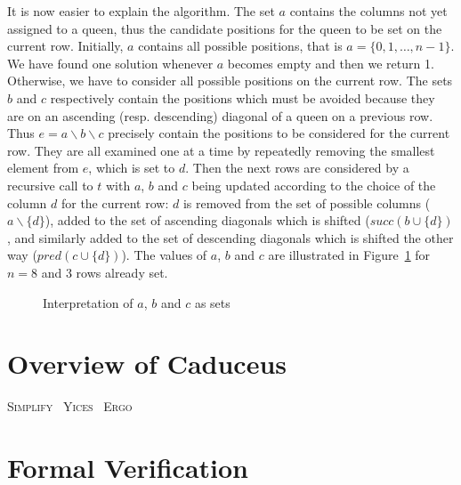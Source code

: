 \documentclass[a4paper]{llncs}
\newcommand{\caduceus}{\textsc{Caduceus}}
\newcommand{\simplify}{\textsc{Simplify}}
\newcommand{\ergo}{\textsc{Ergo}}
\newcommand{\yices}{\textsc{Yices}}
\begin{document}
It is now easier to explain the algorithm. The set $a$ contains the
columns not yet assigned to a queen, thus the candidate positions
for the queen to be set on the current row. Initially, $a$ contains
all possible positions, that is  $a = \{0,1,\dots,n-1\}$. 
We have found one solution whenever $a$ becomes empty and then we return 1.
Otherwise, we have to consider all possible positions on the current
row. The sets $b$ and $c$ respectively contain the positions which
must be avoided because they are on an ascending (resp. descending)
diagonal of a queen on a previous row.
Thus $e = a\backslash b\backslash c$ precisely contain the positions to be
considered for the current row. They are all examined one at a time by
repeatedly removing the smallest element from $e$, which is set to $d$.
Then the next rows are considered by a recursive call to $t$ with $a$,
$b$ and $c$ being updated according to the choice of the column $d$
for the current row: $d$ is removed from the set of possible columns
($a\backslash\{d\}$), added to the set of ascending diagonals which is
shifted ($\mathit{succ}(b\cup\{d\})$, and similarly  added to the set of
descending diagonals which is shifted the other way
($\mathit{pred}(c\cup\{d\})$). 
The values of $a$, $b$ and $c$ are illustrated in Figure~\ref{fig:abc}
for $n=8$ and 3 rows already set.

\begin{figure}
  \hspace*{-3em}
  \caption{Interpretation of $a$, $b$ and $c$ as sets}
  \label{fig:abc}
\end{figure}

\section{Overview of Caduceus}\label{caduceus}

\cite{caduceus,FilliatreMarche04} \cite{why}

\simplify~\cite{simplify} \yices~\cite{yices} \ergo~\cite{ergo} \cite{coq}


\section{Formal Verification}\label{verif}
\end{document}
